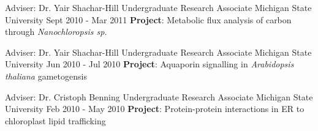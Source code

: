 \begin{cventries}
  \cventry
    {Adviser: Dr. Yair Shachar-Hill} %
    {Undergraduate Research Associate} %
    {Michigan State University} %
    {Sept 2010 - Mar 2011} %
    {{}{\textbf{Project}: Metabolic flux analysis of carbon through \textit{Nanochloropsis sp.}}
    \vspace{2.0mm}}

  \cventry
    {Adviser: Dr. Yair Shachar-Hill} %
    {Undergraduate Research Associate} %
    {Michigan State University} %
    {Jun 2010 - Jul 2010} %
    {{}{\textbf{Project}: Aquaporin signalling in \textit{Arabidopsis thaliana} gametogensis}
    \vspace{2.0mm}}

  \cventry
    {Adviser: Dr. Cristoph Benning} %
    {Undergraduate Research Associate} %
    {Michigan State University} %
    {Feb 2010 - May 2010} %
    {{}{\textbf{Project}: Protein-protein interactions in ER to chloroplast lipid trafficking}
    }
    
\vspace{-4.0mm}
\end{cventries}
